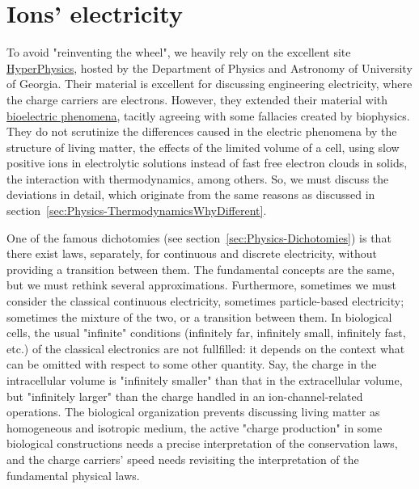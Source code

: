 
\section{Ions' electricity\label{sec:Physics-Electricity}}

To avoid "reinventing the wheel", we heavily rely on the excellent site \href{http://hyperphysics.phy-astr.gsu.edu/hbase/}{HyperPhysics},
hosted by the Department of Physics and Astronomy of University of Georgia.
Their material is excellent for discussing engineering electricity, where the charge carriers are electrons. However, they extended their material with \href{http://hyperphysics.phy-astr.gsu.edu/hbase/electric/bioelcon.html#c1}{bioelectric phenomena},
tacitly agreeing with some fallacies created by biophysics. They do not scrutinize the differences caused in the electric phenomena by the structure of 
living matter, the effects of the limited volume of a cell, using slow positive ions in electrolytic solutions instead of fast free electron clouds in solids,
the interaction with thermodynamics, among others. So, 
we must discuss the deviations in detail, which originate from the same reasons as discussed in section~\ref{sec:Physics-ThermodynamicsWhyDifferent}. 

{
One of the famous dichotomies (see section~\ref{sec:Physics-Dichotomies}) is that there exist laws, separately,
for continuous and discrete electricity, without providing
a transition between them.
The fundamental concepts are the same, but we must rethink several approximations. Furthermore, sometimes we must consider the classical continuous electricity, sometimes particle-based electricity; sometimes the mixture of the two, or a transition
between them. In biological cells, the usual "infinite" conditions (infinitely far, infinitely small, infinitely fast, etc.)
of the classical electronics are not fullfilled: it depends on the context what can be omitted with respect to some other quantity.
Say, the charge in the intracellular volume is "infinitely smaller" than that in the extracellular volume, but "infinitely larger" than the charge handled in an ion-channel-related operations.
The biological organization prevents discussing living matter 
as homogeneous and isotropic medium, the active "charge production" in some biological constructions needs a precise interpretation of the conservation laws, and the charge carriers' speed needs revisiting the interpretation of the fundamental physical laws.
}

